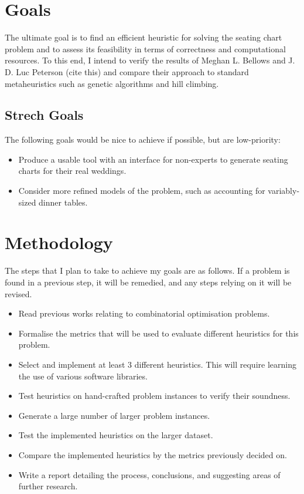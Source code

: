 \documentclass[a4paper,12pt]{article}
\begin{document}
\section*{Goals}

The ultimate goal is to find an efficient heuristic for solving the seating
chart problem and to assess its feasibility in terms of correctness and
computational resources. To this end, I intend to verify the results of Meghan
L. Bellows and J. D. Luc Peterson (cite this) and compare their approach to
standard metaheuristics such as genetic algorithms and hill climbing.

\subsection*{Strech Goals}

The following goals would be nice to achieve if possible, but are low-priority:

\begin{itemize}
\item Produce a usable tool with an interface for non-experts to generate
      seating charts for their real weddings.
\item Consider more refined models of the problem, such as accounting for
      variably-sized dinner tables.
\end{itemize}

\section*{Methodology}

The steps that I plan to take to achieve my goals are as follows. If a problem
is found in a previous step, it will be remedied, and any steps relying on it
will be revised.

\begin{itemize}
\item Read previous works relating to combinatorial optimisation problems.
\item Formalise the metrics that will be used to evaluate different heuristics for
      this problem.
\item Select and implement at least 3 different heuristics. This will require
      learning the use of various software libraries.
\item Test heuristics on hand-crafted problem instances to verify their soundness.
\item Generate a large number of larger problem instances.
\item Test the implemented heuristics on the larger dataset.
\item Compare the implemented heuristics by the metrics previously decided on.
\item Write a report detailing the process, conclusions, and suggesting areas of
      further research.
\end{itemize}
\end{document}

